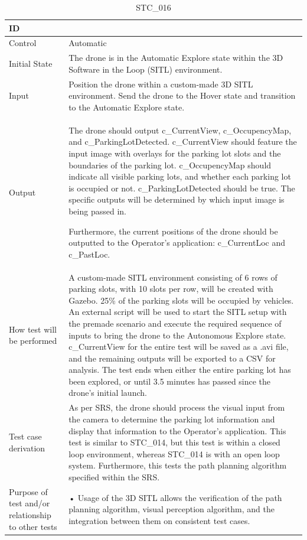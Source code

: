\documentclass[12pt, titlepage]{article}
\begin{document}
\begin{table}[!h]
\begin{center}
\caption {STC\_016}
\label{tab:STC_016}
\begin{tabular}{ | m{1.5cm} | m{15cm} | } 
\hline
ID & \nameref{tab:STC_016} \\ 
\hline
Control & Automatic \\ 
\hline
Initial State & The drone is in the Automatic Explore state within the 3D Software in the Loop (SITL) environment. \\ 
\hline
Input & Position the drone within a custom-made 3D SITL environment. Send the drone to the Hover state and transition to the Automatic Explore state. \\ 
\hline
Output & The drone should output c\_CurrentView, c\_OccupencyMap, and c\_ParkingLotDetected. c\_CurrentView should feature the input image with overlays for the parking lot slots and the boundaries of the parking lot. c\_OccupencyMap should indicate all visible parking lots, and whether each parking lot is occupied or not. c\_ParkingLotDetected should be true. The specific outputs will be determined by which input image is being passed in.

Furthermore, the current positions of the drone should be outputted to the Operator's application: c\_CurrentLoc and c\_PastLoc. \\ 
\hline
How test will be performed & A custom-made SITL environment consisting of 6 rows of parking slots, with 10 slots per row, will be created with Gazebo. 25\% of the parking slots will be occupied by vehicles. An external script will be used to start the SITL setup with the premade scenario and execute the required sequence of inputs to bring the drone to the Autonomous Explore state. c\_CurrentView for the entire test will be saved as a .avi file, and the remaining outputs will be exported to a CSV for analysis. The test ends when either the entire parking lot has been explored, or until 3.5 minutes has passed since the drone's initial launch.
 \\ 
\hline
Test case derivation & As per SRS, the drone should process the visual input from the camera to determine the parking lot information and display that information to the Operator's application. This test is similar to STC_014, but this test is within a closed loop environment, whereas STC_014 is with an open loop system. Furthermore, this tests the path planning algorithm specified within the SRS.
 \\ 
\hline
Purpose of test and/or relationship to other tests &  • Usage of the 3D SITL allows the verification of the path planning algorithm, visual perception algorithm, and the integration between them on consistent test cases.


\end{tabular}
\end{center}
\end{table}
\end{document}
